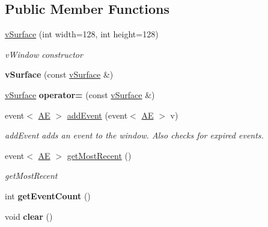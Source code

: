 \subsection*{Public Member Functions}
\begin{DoxyCompactItemize}
\item 
\hyperlink{classev_1_1vSurface_afb642ce656aee165c54a2238474599c0}{v\+Surface} (int width=128, int height=128)
\begin{DoxyCompactList}\small\item\em v\+Window constructor \end{DoxyCompactList}\item 
{\bfseries v\+Surface} (const \hyperlink{classev_1_1vSurface}{v\+Surface} \&)\hypertarget{classev_1_1vSurface_a592c1c79ff294f34e28503d7c7278b8f}{}\label{classev_1_1vSurface_a592c1c79ff294f34e28503d7c7278b8f}

\item 
\hyperlink{classev_1_1vSurface}{v\+Surface} {\bfseries operator=} (const \hyperlink{classev_1_1vSurface}{v\+Surface} \&)\hypertarget{classev_1_1vSurface_af779bb51b4c9f748a0cd38117cf5e1f9}{}\label{classev_1_1vSurface_af779bb51b4c9f748a0cd38117cf5e1f9}

\item 
event$<$ \hyperlink{classev_1_1AddressEvent}{AE} $>$ \hyperlink{classev_1_1vSurface_a60d2f3d18c68d18678040cfabf6d35ea}{add\+Event} (event$<$ \hyperlink{classev_1_1AddressEvent}{AE} $>$ v)
\begin{DoxyCompactList}\small\item\em add\+Event adds an event to the window. Also checks for expired events. \end{DoxyCompactList}\item 
event$<$ \hyperlink{classev_1_1AddressEvent}{AE} $>$ \hyperlink{classev_1_1vSurface_a523c84d62fa48db30913dee7e694b895}{get\+Most\+Recent} ()
\begin{DoxyCompactList}\small\item\em get\+Most\+Recent \end{DoxyCompactList}\item 
int {\bfseries get\+Event\+Count} ()\hypertarget{classev_1_1vSurface_aa90e7d977149ee42dff7a2735b367a2b}{}\label{classev_1_1vSurface_aa90e7d977149ee42dff7a2735b367a2b}

\item 
void {\bfseries clear} ()\hypertarget{classev_1_1vSurface_a222eadfa9d900d22148d1ffb0bb68661}{}\label{classev_1_1vSurface_a222eadfa9d900d22148d1ffb0bb68661}


\end{DoxyCompactItemize}
